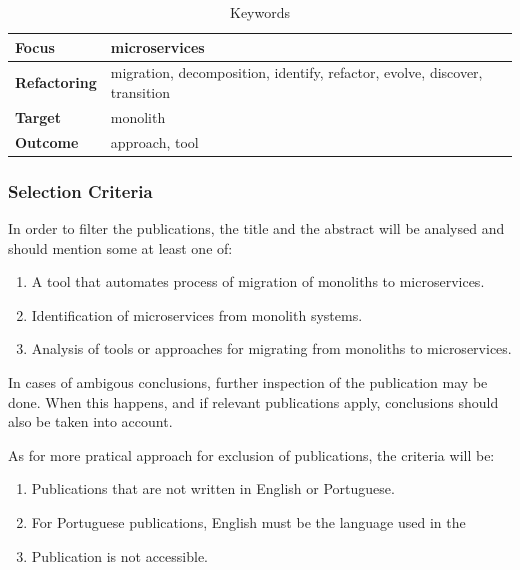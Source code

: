 \documentclass[conference]{IEEEtran}
\begin{document}
\begin{table}[!htb] \caption{Keywords} \label{tab:keywords}
  \begin{center}
    \begin{tabular}[c]{p{7em}|p{13em}} {\textbf{Focus}} & microservices \\
      \hline \textbf{Refactoring} & {migration, decomposition, identify, refactor, evolve, discover, transition } \\
      \hline \textbf{Target} & monolith \\
      \hline \textbf{Outcome} & approach, tool \\
    \end{tabular}
  \end{center}
\end{table}


\subsubsection{Selection Criteria} \label{sub:selection-criteria}

In order to filter the publications, the title and the abstract will be
analysed and should mention some at least one of:

\begin{enumerate}[{IC}1.]
  \item A tool that automates process of migration of monoliths to
    microservices.
  \item Identification of microservices from monolith systems.
  \item Analysis of tools or approaches for migrating from monoliths to
    microservices.
\end{enumerate}

In cases of ambigous conclusions, further inspection of the publication may
be done. When this happens, and if relevant publications apply, conclusions
should also be taken into account.

As for more pratical approach for exclusion of publications, the criteria
will be:

\begin{enumerate}[{EC}1.]
  \item Publications that are not written in English or Portuguese.
  \item For Portuguese publications, English must be the language used in
    the
  \item Publication is not accessible.
\end{enumerate}
\end{document}
